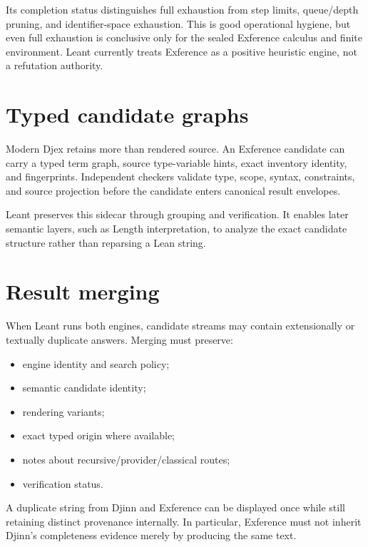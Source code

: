 \documentclass[10pt,letterpaper,oneside,openany]{report}
\begin{document}
Its completion status distinguishes full exhaustion from step limits, queue/depth pruning, and identifier-space exhaustion.  This is good operational hygiene, but even full exhaustion is conclusive only for the sealed Exference calculus and finite environment.  Leant currently treats Exference as a positive heuristic engine, not a refutation authority.

\section{Typed candidate graphs}

Modern Djex retains more than rendered source.  An Exference candidate can carry a typed term graph, source type-variable hints, exact inventory identity, and fingerprints.  Independent checkers validate type, scope, syntax, constraints, and source projection before the candidate enters canonical result envelopes.

Leant preserves this sidecar through grouping and verification.  It enables later semantic layers, such as Length interpretation, to analyze the exact candidate structure rather than reparsing a Lean string.

\section{Result merging}

When Leant runs both engines, candidate streams may contain extensionally or textually duplicate answers.  Merging must preserve:

\begin{itemize}
\item engine identity and search policy;
\item semantic candidate identity;
\item rendering variants;
\item exact typed origin where available;
\item notes about recursive/provider/classical routes;
\item verification status.
\end{itemize}

A duplicate string from Djinn and Exference can be displayed once while still retaining distinct provenance internally.  In particular, Exference must not inherit Djinn's completeness evidence merely by producing the same text.
\end{document}
